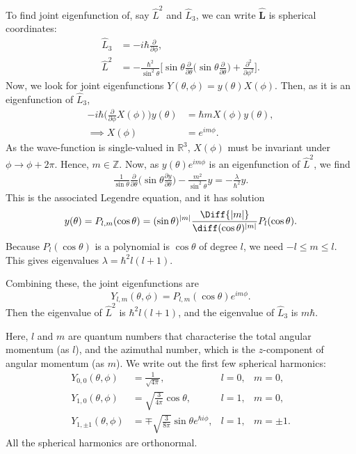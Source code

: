 \documentclass[12pt]{article}
\begin{document}
To find joint eigenfunction of, say $\hat L^2$ and $\hat L_3$, we can write $\mathbf{\hat L}$ is spherical coordinates:
\begin{align*}
	\hat L_3 &= - i \hbar \frac{\partial}{\partial \phi}, \\
	\hat L^2 &= - \frac{\hbar^2}{\sin^2 \theta} \bigg[ \sin \theta \frac{\partial}{\partial \theta} \biggl( \sin \theta \frac{\partial}{\partial \theta} \biggr) + \frac{\partial^2}{\partial \phi^2} \biggr].
\end{align*}
Now, we look for joint eigenfunctions $Y(\theta, \phi) = y(\theta) X(\phi)$. Then, as it is an eigenfunction of $\hat L_3$,
\begin{align*}
	- i \hbar \biggl( \frac{\partial}{\partial \phi} X(\phi) \biggr) y(\theta) &= \hbar m X(\phi) y (\theta), \\
	\implies X(\phi) &= e^{i m \phi}.
\end{align*}
As the wave-function is single-valued in $\mathbb{R}^3$, $X(\phi)$ must be invariant under $\phi \to \phi + 2\pi$. Hence, $m \in \mathbb{Z}$. Now, as $y(\theta)e^{im\phi}$ is an eigenfunction of $\hat L^2$, we find
\begin{align*}
	\frac{1}{\sin \theta}\frac{\partial}{\partial \theta} \biggl( \sin \theta \frac{\partial y}{\partial \theta} \biggr) - \frac{m^2}{\sin^2 \theta}y = - \frac{\lambda}{\hbar^2} y.
\end{align*}
This is the associated Legendre equation, and it has solution
\[
	y(\theta) = P_{l, m}(\cos \theta) = (\sin \theta)^{|m|}\frac{\Diff{|m|}}{\diff (\cos \theta)^{|m|}} P_l(\cos \theta)
.\]
Because $P_l(\cos \theta)$ is a polynomial is $\cos \theta$ of degree $l$, we need $-l \leq m \leq l$. This gives eigenvalues $\lambda = \hbar^2 l(l+1)$.

Combining these, the joint eigenfunctions are
\[
	Y_{l,m}(\theta, \phi) = P_{l, m}(\cos \theta) e^{i m \phi}
.\]
Then the eigenvalue of $\hat L^2$ is $\hbar^2 l(l+1)$, and the eigenvalue of $\hat L_3$ is $m \hbar$.

Here, $l$ and $m$ are quantum numbers that characterise the total angular momentum (as $l$), and the azimuthal  number, which is the $z$-component of angular momentum (as $m$). We write out the first few spherical harmonics:
\begin{align*}
	Y_{0,0}(\theta, \phi) &= \frac{1}{\sqrt{4\pi}}, & l = 0,& m = 0, \\
	Y_{1,0}(\theta, \phi) &= \sqrt{\frac{3}{4\pi}} \cos \theta, & l = 1,& m = 0, \\
	Y_{1, \pm 1}(\theta, \phi) &= \mp \sqrt{\frac{3}{8\pi}} \sin \theta e^{\hbar i \phi}, & l = 1,&m = \pm 1.
\end{align*}
All the spherical harmonics are orthonormal.
\end{document}
